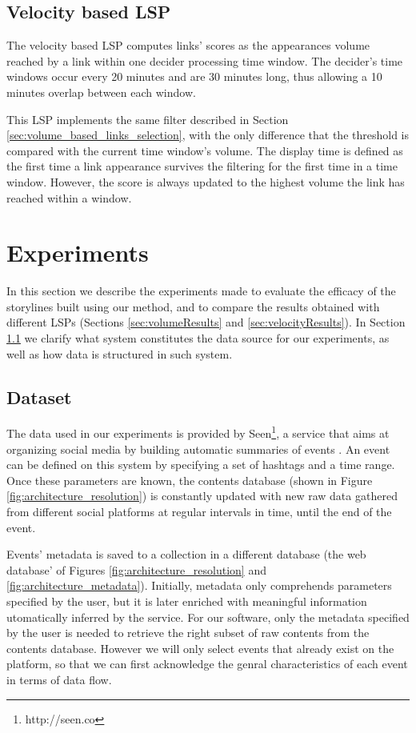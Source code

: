 \documentclass{sig-alternate}
\begin{document}
\subsection{Velocity based LSP}
\label{sec:velocity_based_links_selection}
The velocity based LSP computes links' scores as the appearances volume reached by a link within one decider processing time window. The decider's time windows occur every 20 minutes and are 30 minutes long, thus allowing a 10 minutes overlap between each window.

This LSP implements the same filter described in Section \ref{sec:volume_based_links_selection}, with the only difference that the threshold is compared with the current time window's volume. The display time is defined as the first time a link appearance survives the filtering for the first time in a time window. However, the score is always updated to the highest volume the link has reached within a window.


\section{Experiments}
\label{sec:experiment}
In this section we describe the experiments made to evaluate the efficacy of the storylines built using our method, and to compare the results obtained with different LSPs (Sections \ref{sec:volumeResults} and \ref{sec:velocityResults}). In Section \ref{sec:dataset} we clarify what system constitutes the data source for our experiments, as well as how data is structured in such system.

\subsection{Dataset}
\label{sec:dataset}
The data used in our experiments is provided by Seen\footnote{http://seen.co}, a service that aims at organizing social media by building automatic summaries of events \cite{SeenWired}. An event can be defined on this system by specifying a set of hashtags and a time range. Once these parameters are known, the contents database (shown in Figure \ref{fig:architecture_resolution}) is constantly updated with new raw data gathered from different social platforms at regular intervals in time, until the end of the event.

Events' metadata is saved to a collection in a different database (the web database' of Figures \ref{fig:architecture_resolution} and \ref{fig:architecture_metadata}). Initially, metadata only comprehends parameters specified by the user, but it is later enriched with meaningful information utomatically inferred by the service. For our software, only the metadata specified by the user is needed to retrieve the right subset of raw contents from the contents database. However we will only select events that already exist on the platform, so that we can first acknowledge the genral characteristics of each event in terms of data flow.
\end{document}
